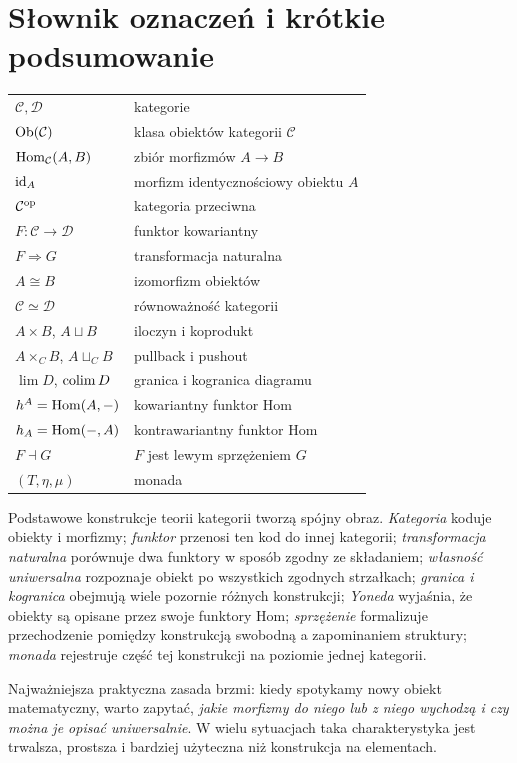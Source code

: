 \section{Słownik oznaczeń i krótkie podsumowanie}\label{sec:slownik}

\begin{center}
\begin{tabular}{@{}ll@{}}
$\mathcal C,\mathcal D$ & kategorie \\
$\operatorname{Ob}(\mathcal C)$ & klasa obiektów kategorii $\mathcal C$ \\
$\operatorname{Hom}_{\mathcal C}(A,B)$ & zbiór morfizmów $A\to B$ \\
$\mathrm{id}_A$ & morfizm identycznościowy obiektu $A$ \\
$\mathcal C^{\mathrm{op}}$ & kategoria przeciwna \\
$F:\mathcal C\to\mathcal D$ & funktor kowariantny \\
$F\Rightarrow G$ & transformacja naturalna \\
$A\cong B$ & izomorfizm obiektów \\
$\mathcal C\simeq\mathcal D$ & równoważność kategorii \\
$A\times B$, $A\sqcup B$ & iloczyn i koprodukt \\
$A\times_C B$, $A\sqcup_C B$ & pullback i pushout \\
$\lim D$, $\operatorname{colim} D$ & granica i kogranica diagramu \\
$h^A=\operatorname{Hom}(A,-)$ & kowariantny funktor Hom \\
$h_A=\operatorname{Hom}(-,A)$ & kontrawariantny funktor Hom \\
$F\dashv G$ & $F$ jest lewym sprzężeniem $G$ \\
$(T,\eta,\mu)$ & monada \\
\end{tabular}
\end{center}

Podstawowe konstrukcje teorii kategorii tworzą spójny obraz. \emph{Kategoria} koduje obiekty i morfizmy; \emph{funktor} przenosi ten kod do innej kategorii; \emph{transformacja naturalna} porównuje dwa funktory w sposób zgodny ze składaniem; \emph{własność uniwersalna} rozpoznaje obiekt po wszystkich zgodnych strzałkach; \emph{granica i kogranica} obejmują wiele pozornie różnych konstrukcji; \emph{Yoneda} wyjaśnia, że obiekty są opisane przez swoje funktory Hom; \emph{sprzężenie} formalizuje przechodzenie pomiędzy konstrukcją swobodną a zapominaniem struktury; \emph{monada} rejestruje część tej konstrukcji na poziomie jednej kategorii.

Najważniejsza praktyczna zasada brzmi: kiedy spotykamy nowy obiekt matematyczny, warto zapytać, \emph{jakie morfizmy do niego lub z niego wychodzą i czy można je opisać uniwersalnie}. W wielu sytuacjach taka charakterystyka jest trwalsza, prostsza i bardziej użyteczna niż konstrukcja na elementach.


